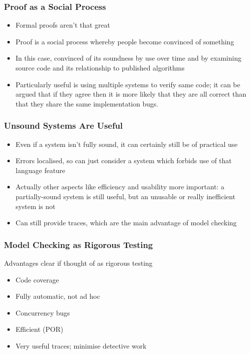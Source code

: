 \documentclass[12pt,a4paper,twoside,openright]{report}
\begin{document}
\subsubsection{Proof as a Social Process}
\begin{itemize}
	\item Formal proofs aren't that great
	\item Proof is a social process whereby
	people become convinced of something
	\item In this case, convinced of its
	soundness by use over time and by
	examining source code and its
	relationship to published algorithms
	\item Particularly useful is using
	multiple systems to verify same code;
	it can be argued that if they agree
	then it is more likely that they are
	all correct than that they share the
	same implementation bugs.
\end{itemize}
\subsubsection{Unsound Systems Are Useful}
\begin{itemize}
	\item Even if a system isn't fully sound,
	it can certainly still be of practical use
	\item Errors localised, so can just consider
	a system which forbids use of that language
	feature
	\item Actually other aspects like efficiency
	and usability more important: a partially-sound
	system is still useful, but an unusable or
	really inefficient system is not
	\item Can still provide traces, which are
	the main advantage of model checking
\end{itemize}
\subsubsection{Model Checking as Rigorous Testing}
Advantages clear if thought of as rigorous
testing
\begin{itemize}
	\item Code coverage
	\item Fully automatic, not ad hoc
	\item Concurrency bugs
	\item Efficient (POR)
	\item Very useful traces; minimise detective work
\end{itemize}
\end{document}
